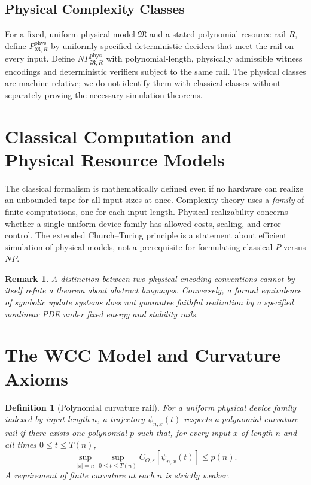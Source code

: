 \documentclass[11pt,a4paper]{article}
\newtheorem{definition}[theorem]{Definition}
\newtheorem{remark}[theorem]{Remark}
\newcommand{\CTheta}{C_{\Theta,\varepsilon}}
\begin{document}
\subsection{Physical Complexity Classes}
For a fixed, uniform physical model $\mathfrak M$ and a stated polynomial
resource rail $R$, define $P^{\mathrm{phys}}_{\mathfrak M,R}$ by uniformly
specified deterministic deciders that meet the rail on every input. Define
$NP^{\mathrm{phys}}_{\mathfrak M,R}$ with polynomial-length, physically
admissible witness encodings and deterministic verifiers subject to the
same rail. The physical classes are machine-relative; we do not identify
them with classical classes without separately proving the necessary
simulation theorems.

\section{Classical Computation and Physical Resource Models}
\label{sec:tm_not_physical}
The classical formalism is mathematically defined even if no hardware can
realize an unbounded tape for all input sizes at once. Complexity theory
uses a \emph{family} of finite computations, one for each input length.
Physical realizability concerns whether a single uniform device family has
allowed costs, scaling, and error control. The extended Church--Turing
principle is a statement about efficient simulation of physical models, not
a prerequisite for formulating classical $P$ versus $NP$.

\begin{remark}
A distinction between two physical encoding conventions cannot by itself
refute a theorem about abstract languages. Conversely, a formal equivalence
of symbolic update systems does not guarantee faithful realization by a
specified nonlinear PDE under fixed energy and stability rails.
\end{remark}

\section{The WCC Model and Curvature Axioms}
\label{sec:wcc_axioms}
\begin{definition}[Polynomial curvature rail]
For a uniform physical device family indexed by input length $n$, a
trajectory $\psi_{n,x}(t)$ respects a polynomial curvature rail if there
exists one polynomial $p$ such that, for every input $x$ of length $n$ and
all times $0\le t\le T(n)$,
\[
\sup_{|x|=n}\sup_{0\le t\le T(n)}
\CTheta[\psi_{n,x}(t)]\le p(n).
\]
A requirement of \emph{finite} curvature at each $n$ is strictly weaker.
\end{definition}
\end{document}
